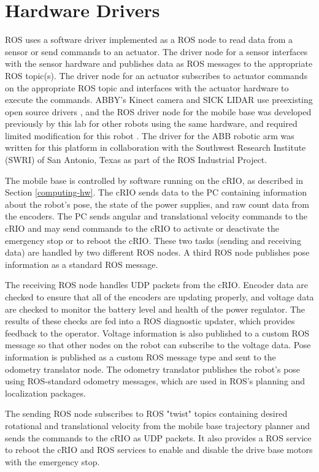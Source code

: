 \documentclass[]{cwru} %
\begin{document}
\section{Hardware Drivers}
\label{hardware-drivers}

ROS uses a
software driver implemented as a ROS node to read data from a sensor or
send commands to an actuator. The driver node for a sensor interfaces
with the sensor hardware and publishes data as ROS messages to the
appropriate ROS topic(s). The driver node for an actuator subscribes to
actuator commands on the appropriate ROS topic and interfaces with the
actuator hardware to execute the commands. ABBY's Kinect camera and SICK
LIDAR use preexisting open source drivers \cite{kinect} \cite{laser_drivers},
and the ROS driver node for the mobile base was developed previously by this 
lab for other robots using the same hardware, and required limited modification
for this robot \cite{harlie}. The driver for the ABB robotic arm was written
for this platform in collaboration with the Southwest Research Institute
(SWRI) of San Antonio, Texas as part of the ROS Industrial Project.

The mobile
base is controlled by software running on the cRIO, as described in Section
\ref{computing-hw}. The cRIO sends data to the PC containing information
about the robot's pose, the state of the power supplies, and raw count
data from the encoders. The PC sends angular and translational velocity
commands to the cRIO and may send commands to the cRIO to activate or
deactivate the emergency stop or to reboot the cRIO. These two tasks
(sending and receiving data) are handled by two different ROS nodes. A
third ROS node publishes pose information as a standard ROS message.

The receiving ROS node handles UDP packets from the cRIO. Encoder data
are checked to ensure that all of the encoders are updating properly,
and voltage data are checked to monitor the battery level and health of
the power regulator. The results of these checks are fed into a ROS
diagnostic updater, which provides feedback to the operator. Voltage
information is also published to a custom ROS message so that other
nodes on the robot can subscribe to the voltage data. Pose information
is published as a custom ROS message type and sent to the odometry
translator node. The odometry translator publishes the robot's pose
using ROS-standard odometry messages, which are used in ROS's planning
and localization packages.

The sending ROS node subscribes to ROS "twist" topics containing desired
rotational and translational velocity from the mobile base trajectory
planner and sends the commands to the cRIO as UDP packets. It also
provides a ROS service to reboot the cRIO and ROS services to enable and
disable the drive base motors with the emergency stop.
\end{document}
